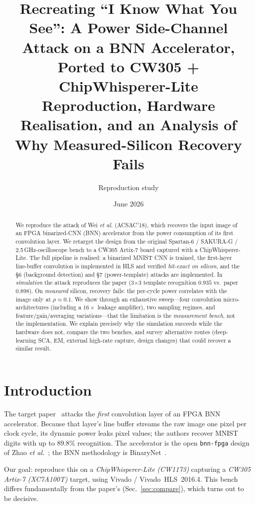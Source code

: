 \documentclass[10pt]{article}
\title{\textbf{Recreating ``I Know What You See'': A Power Side-Channel Attack on a
BNN Accelerator, Ported to CW305 + ChipWhisperer-Lite}\\
\large Reproduction, Hardware Realisation, and an Analysis of Why Measured-Silicon
Recovery Fails}
\author{Reproduction study}
\date{June 2026}
\begin{document}
\maketitle

\begin{abstract}
We reproduce the attack of Wei \emph{et al.} (ACSAC'18), which recovers the input image
of an FPGA binarized-CNN (BNN) accelerator from the power consumption of its first
convolution layer. We retarget the design from the original Spartan-6 / SAKURA-G /
2.5\,GHz-oscilloscope bench to a CW305 Artix-7 board captured with a ChipWhisperer-Lite.
The full pipeline is realised: a binarized MNIST CNN is trained, the first-layer
line-buffer convolution is implemented in HLS and verified \emph{bit-exact on silicon},
and the §6 (background detection) and §7 (power-template) attacks are implemented. In
\emph{simulation} the attack reproduces the paper (3$\times$3 template recognition
$0.935$ vs.\ paper $0.898$). On \emph{measured} silicon, recovery fails: the per-cycle
power correlates with the image only at $\rho\!\approx\!0.1$. We show through an
exhaustive sweep---four convolution micro-architectures (including a $16\times$ leakage
amplifier), two sampling regimes, and feature/gain/averaging variations---that the
limitation is the \emph{measurement bench}, not the implementation. We explain precisely
why the simulation succeeds while the hardware does not, compare the two benches, and
survey alternative routes (deep-learning SCA, EM, external high-rate capture, design
changes) that could recover a similar result.
\end{abstract}

\section{Introduction}
The target paper~\cite{wei2018} attacks the \emph{first} convolution layer of an
FPGA BNN accelerator. Because that layer's line buffer streams the raw image one pixel per
clock cycle, its dynamic power leaks pixel values; the authors recover MNIST digits with up
to $89.8\%$ recognition. The accelerator is the open \texttt{bnn-fpga} design of Zhao
\emph{et al.}~\cite{zhao2017}; the BNN methodology is BinaryNet~\cite{hubara2016}.

Our goal: reproduce this on a \emph{ChipWhisperer-Lite (CW1173)} capturing a
\emph{CW305 Artix-7 (XC7A100T)} target, using Vivado / Vivado~HLS~2016.4. This bench
differs fundamentally from the paper's (Sec.~\ref{sec:compare}), which turns out to be
decisive.
\end{document}
